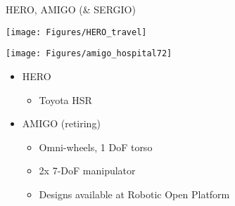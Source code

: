 \documentclass[12pt,a4paper]{article}
\newcommand{\emptylogo}{\texttt{[image: Figures/Empty]}}
\begin{document}
\begin{slidetop}


\begin{multicols}{2}

\begin{bclogo}[couleur = white, arrondi = 0.25, couleurBord = tuedarkblue , barre = none, logo=\emptylogo]{\textcolor{tuedarkblue}{HERO, AMIGO (\& SERGIO)}}
\medskip %
\begin{minipage}[T]{0.48\linewidth}
	\begin{center}
		\texttt{[image: Figures/HERO\_travel]}
	\end{center}
\end{minipage}
\hfill
\begin{minipage}[T]{0.48\linewidth}
	\begin{center}
		\texttt{[image: Figures/amigo\_hospital72]}
	\end{center}
\end{minipage}
    \begin{itemize}[topsep=0pt, itemsep = 0pt, parsep = 0pt, leftmargin=15pt]
        \item HERO
        \begin{itemize}[topsep=0pt, itemsep = 0pt, parsep = 0pt, leftmargin=15pt]
            \item Toyota HSR
        \end{itemize}
        \item AMIGO (retiring)
            \begin{itemize}[topsep=0pt, itemsep = 0pt, parsep = 0pt, leftmargin=15pt]
            \item Omni-wheels, 1 DoF torso
            \item 2x 7-DoF manipulator
            \item Designs available at Robotic Open Platform
        \end{itemize}
    \end{itemize}
\end{bclogo}


\end{multicols}
\end{slidetop}
\end{document}

